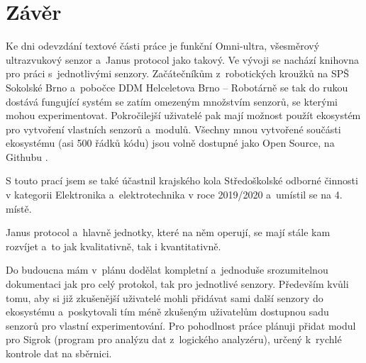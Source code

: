 \newpage
\chapter*{Závěr}

Ke dni odevzdání textové části práce je funkční Omni-ultra, všesměrový ultrazvukový senzor a~Janus protocol jako takový.
Ve vývoji se nachází knihovna pro práci s~jednotlivými senzory.
Začátečníkům z~robotických kroužků na SPŠ Sokolské Brno \cite{sokolska} a~pobočce DDM Helceletova Brno -- Robotárně \cite{robotarna} se tak do rukou dostává fungující systém se zatím omezeným množstvím senzorů, se kterými mohou experimentovat.
Pokročilejší uživatelé pak mají možnost použít ekosystém pro vytvoření vlastních senzorů a~modulů.
Všechny mnou vytvořené součásti ekosystému (asi 500 řádků kódu) jsou volně dostupné jako Open Source, na Githubu \cite{protocol}.

S touto prací jsem se také účastnil krajského kola Středoškolské odborné činnosti v kategorii Elektronika a~elektrotechnika v roce 2019/2020 a~umístil se na 4. místě.


Janus protocol a~hlavně jednotky, které na něm operují, se mají stále kam rozvíjet a~to jak kvalitativně, tak i kvantitativně.

Do budoucna mám v~plánu dodělat kompletní a~jednoduše srozumitelnou dokumentaci jak pro celý protokol, tak pro jednotlivé senzory.
Především kvůli tomu, aby si již zkušenější uživatelé mohli přidávat sami další senzory do ekosystému a~poskytovali tím méně zkušeným uživatelům dostupnou sadu senzorů pro vlastní experimentování.
Pro pohodlnost práce plánuji přidat modul pro Sigrok (program pro analýzu dat z~logického analyzéru), určený k~rychlé kontrole dat na sběrnici.
